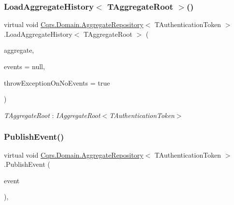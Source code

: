 \subsubsection{\texorpdfstring{Load\+Aggregate\+History$<$ T\+Aggregate\+Root $>$()}{LoadAggregateHistory< TAggregateRoot >()}}
{\footnotesize\ttfamily virtual void \hyperlink{classCqrs_1_1Domain_1_1AggregateRepository}{Cqrs.\+Domain.\+Aggregate\+Repository}$<$ T\+Authentication\+Token $>$.Load\+Aggregate\+History$<$ T\+Aggregate\+Root $>$ (\begin{DoxyParamCaption}\item[{T\+Aggregate\+Root}]{aggregate,  }\item[{I\+List$<$ \hyperlink{interfaceCqrs_1_1Events_1_1IEvent}{I\+Event}$<$ T\+Authentication\+Token $>$$>$}]{events = {\ttfamily null},  }\item[{bool}]{throw\+Exception\+On\+No\+Events = {\ttfamily true} }\end{DoxyParamCaption})\hspace{0.3cm}{\ttfamily [virtual]}}

\begin{Desc}
\item[Type Constraints]\begin{description}
\item[{\em T\+Aggregate\+Root} : {\em I\+Aggregate\+Root$<$T\+Authentication\+Token$>$}]\end{description}
\end{Desc}
\mbox{\label{classCqrs_1_1Domain_1_1AggregateRepository_a3191ba3d6fa4f6b904128c4731262944_a3191ba3d6fa4f6b904128c4731262944}} 
\subsubsection{\texorpdfstring{Publish\+Event()}{PublishEvent()}}
{\footnotesize\ttfamily virtual void \hyperlink{classCqrs_1_1Domain_1_1AggregateRepository}{Cqrs.\+Domain.\+Aggregate\+Repository}$<$ T\+Authentication\+Token $>$.Publish\+Event (\begin{DoxyParamCaption}\item[{\hyperlink{interfaceCqrs_1_1Events_1_1IEvent}{I\+Event}$<$ T\+Authentication\+Token $>$ @}]{event }\end{DoxyParamCaption})\hspace{0.3cm}{\ttfamily [protected]}, {\ttfamily [virtual]}}



